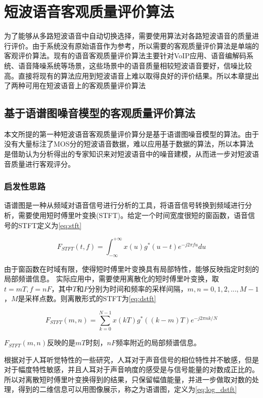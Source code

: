 \chapter{短波语音客观质量评价算法}
\label{chapter:algorithms}

为了能够从多路短波语音中自动切换选择，需要使用算法对各路短波语音的质量进行评价。由于系统没有原始语音作为参考，所以需要的客观质量评价算法是单端的客观评价算法。现有的语音客观质量评价算法主要针对VoIP应用、语音编解码系统、语音降噪系统等场景，这些场景中的语音质量相较短波语音要好，信噪比较高。直接将现有的算法应用到短波语音上难以取得良好的评价结果。所以本章提出了两种可用在短波语音上的客观质量评价算法

\section{基于语谱图噪音模型的客观质量评价算法}

本文所提的第一种短波语音客观质量评价算分是基于语谱图噪音模型的算法。由于没有大量标注了MOS分的短波语音数据，难以应用基于数据的算法，所以本算法是借助认为分析得出的专家知识来对短波语音中的噪音建模，从而进一步对短波语音质量进行客观评分。

\subsection{启发性思路} \label{section:alg1-1}

语谱图是一种从频域对语音信号进行分析的工具，将语音信号转换到频域进行分析，需要使用短时傅里叶变换(STFT)。给定一个时间宽度很短的窗函数，语音信号的STFT定义为\ref{eq:stft}

\begin{equation}\label{eq:stft}
F_{STFT}(t, f) = \int_{-\infty}^{+\infty}x(u)g^*(u-t)e^{-j2\pi fu}du
\end{equation}

由于窗函数在时域有限，使得短时傅里叶变换具有局部特性，能够反映指定时刻的局部频谱信息。
实际应用中，需要使用离散化的短时傅里叶变换，取$t=mT, f=nF$，其中$T$和$F$分别为时间和频率的采样间隔，$m,n=0,1,2,...,M-1$，$M$是采样点数。则离散形式的STFT为\ref{eq:dstft}

\begin{equation}\label{eq:dstft}
F_{STFT}(m, n) = \sum_{k=0}^{N-1}x(kT)g^*((k-m)T)e^{-j2\pi nk/N}
\end{equation}

$F_{STFT}(m, n)$反映的是$mT$时刻，$nF$频率附近的局部频谱信息。

根据对于人耳听觉特性的一些研究，人耳对于声音信号的相位特性并不敏感，但是对于幅度特性敏感，并且人耳对于声音响度的感受是与信号能量的对数成正比的。所以对离散短时傅里叶变换得到的结果，只保留幅值能量，并进一步做取对数的处理，得到的二维信息可以用图像展示，称之为语谱图，定义为\ref{eq:log_dstft}

